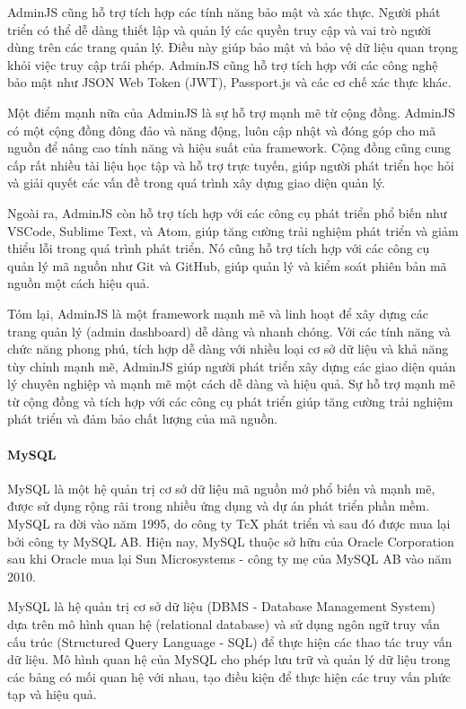 AdminJS cũng hỗ trợ tích hợp các tính năng bảo mật và xác thực. Người phát triển có thể dễ dàng thiết lập và quản lý các quyền truy cập và vai trò người dùng trên các trang quản lý. Điều này giúp bảo mật và bảo vệ dữ liệu quan trọng khỏi việc truy cập trái phép. AdminJS cũng hỗ trợ tích hợp với các công nghệ bảo mật như JSON Web Token (JWT), Passport.js và các cơ chế xác thực khác.

Một điểm mạnh nữa của AdminJS là sự hỗ trợ mạnh mẽ từ cộng đồng. AdminJS có một cộng đồng đông đảo và năng động, luôn cập nhật và đóng góp cho mã nguồn để nâng cao tính năng và hiệu suất của framework. Cộng đồng cũng cung cấp rất nhiều tài liệu học tập và hỗ trợ trực tuyến, giúp người phát triển học hỏi và giải quyết các vấn đề trong quá trình xây dựng giao diện quản lý.

Ngoài ra, AdminJS còn hỗ trợ tích hợp với các công cụ phát triển phổ biến như VSCode, Sublime Text, và Atom, giúp tăng cường trải nghiệm phát triển và giảm thiểu lỗi trong quá trình phát triển. Nó cũng hỗ trợ tích hợp với các công cụ quản lý mã nguồn như Git và GitHub, giúp quản lý và kiểm soát phiên bản mã nguồn một cách hiệu quả.

Tóm lại, AdminJS là một framework mạnh mẽ và linh hoạt để xây dựng các trang quản lý (admin dashboard) dễ dàng và nhanh chóng. Với các tính năng và chức năng phong phú, tích hợp dễ dàng với nhiều loại cơ sở dữ liệu và khả năng tùy chỉnh mạnh mẽ, AdminJS giúp người phát triển xây dựng các giao diện quản lý chuyên nghiệp và mạnh mẽ một cách dễ dàng và hiệu quả. Sự hỗ trợ mạnh mẽ từ cộng đồng và tích hợp với các công cụ phát triển giúp tăng cường trải nghiệm phát triển và đảm bảo chất lượng của mã nguồn.

\paragraph{MySQL}
\mbox{}

MySQL là một hệ quản trị cơ sở dữ liệu mã nguồn mở phổ biến và mạnh mẽ, được sử dụng rộng rãi trong nhiều ứng dụng và dự án phát triển phần mềm. MySQL ra đời vào năm 1995, do công ty TcX phát triển và sau đó được mua lại bởi công ty MySQL AB. Hiện nay, MySQL thuộc sở hữu của Oracle Corporation sau khi Oracle mua lại Sun Microsystems - công ty mẹ của MySQL AB vào năm 2010.

MySQL là hệ quản trị cơ sở dữ liệu (DBMS - Database Management System) dựa trên mô hình quan hệ (relational database) và sử dụng ngôn ngữ truy vấn cấu trúc (Structured Query Language - SQL) để thực hiện các thao tác truy vấn dữ liệu. Mô hình quan hệ của MySQL cho phép lưu trữ và quản lý dữ liệu trong các bảng có mối quan hệ với nhau, tạo điều kiện để thực hiện các truy vấn phức tạp và hiệu quả.

